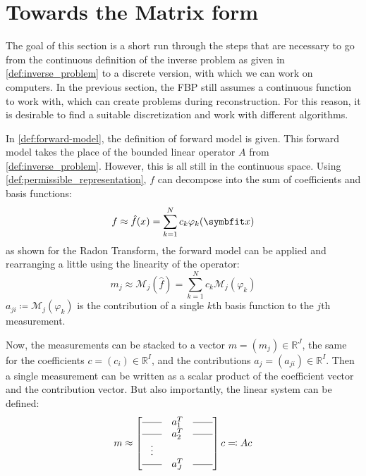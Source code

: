 
\section{Towards the Matrix form}\label{sec:matrix_formulation}

The goal of this section is a short run through the steps that are necessary to go from the
continuous definition of the inverse problem as given in \autoref{def:inverse_problem} to a discrete
version, with which we can work on computers. In the previous section, the FBP still assumes a
continuous function to work with, which can create problems during reconstruction. For this reason,
it is desirable to find a suitable discretization and work with different algorithms.

In \autoref{def:forward-model}, the definition of forward model is given. This forward model
takes the place of the bounded linear operator \(A\) from \autoref{def:inverse_problem}. However,
this is all still in the continuous space. Using \autoref{def:permissible_representation}, \(f\) can
decompose into the sum of coefficients and basis functions:
\[ f \approx \near{f}(x) = \sum_{k=1}^{N} c_k \varphi_k(\mvec{x}) \]
as shown for the Radon Transform, the forward model can be applied and rearranging a little using
the linearity of the operator:
\[ m_j \approx \mathscr{M}_j(\hat{f}) = \sum_{k=1}^{N} c_k \mathscr{M}_j(\varphi_k) \]
\(a_{ji} \coloneq \mathscr{M}_j(\varphi_k)\) is the contribution of a single \(k\)th basis function
to the \(j\)th measurement.


Now, the measurements can be stacked to a vector \(m = (m_j) \in \mathbb{R}^J\), the same for
the coefficients \(c = (c_i) \in \mathbb{R}^I\), and the contributions \(a_{j} = (a_{ji}) \in
\mathbb{R}^I\). Then a single measurement can be written as a scalar product of the coefficient
vector and the contribution vector. But also importantly, the linear system can be defined:
\begin{equation}\label{eq:system_lin_equation}
	m \approx
	\begin{bmatrix}
		\rule[.5ex]{2em}{0.4pt} & a_1^T & \rule[.5ex]{2em}{0.4pt} \\
		\rule[.5ex]{2em}{0.4pt} & a_2^T & \rule[.5ex]{2em}{0.4pt} \\
		\vdots                                                    \\
		\rule[.5ex]{2em}{0.4pt} & a_J^T & \rule[.5ex]{2em}{0.4pt}
	\end{bmatrix} c \eqcolon A c
\end{equation}

